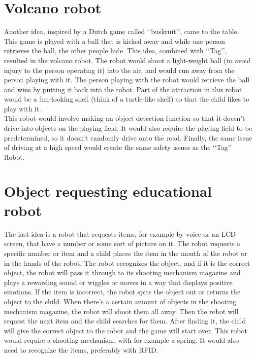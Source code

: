 \documentclass[11pt,twoside,a4paper]{report}
\begin{document}
\section{Volcano robot}
Another idea, inspired by a Dutch game called \lq\lq{}buskruit\rq\rq{}, came to the table. This game is played with a ball that is kicked away and while one person retrieves the ball, the other people hide. This idea, combined with \lq\lq{}Tag\rq\rq{}, resulted in the volcano robot. The robot would shoot a light-weight ball (to avoid injury to the person operating it) into the air, and would run away from the person playing with it. The person playing with the robot would retrieve the ball and wins by putting it back into the robot. Part of the attraction in this robot would be a fun-looking shell (think of a turtle-like shell) so that the child likes to play with it. \\
This robot would involve making an object detection function so that it doesn\rq{}t drive into objects on the playing field. It would also require the playing field to be predetermined, so it doesn\rq{}t randomly drive onto the road. Finally, the same issue of driving at a high speed would create the same safety issues as the \lq\lq{}Tag\rq\rq{} Robot.
\section{Object requesting educational robot}
The last idea is a robot that requests items, for example by voice or an LCD screen, that have a number or some sort of picture on it. The robot requests a specific number or item and a child places the item in the mouth of the robot or in the hands of the robot. The robot recognizes the object, and if it is the correct object, the robot will pass it through to its shooting mechanism magazine and plays a rewarding sound or wiggles or moves in a way that displays positive emotions. If the item is incorrect, the robot spits the object out or returns the object to the child. When there\rq{}s a certain amount of objects in the shooting mechanism magazine, the robot will shoot them all away. Then the robot will request the next item and the child searches for them. After finding it, the child will give the correct object to the robot and the game will start over.
This robot would require a shooting mechanism, with for example a spring. It would also need to recognize the items, preferably with RFID.
\end{document}
